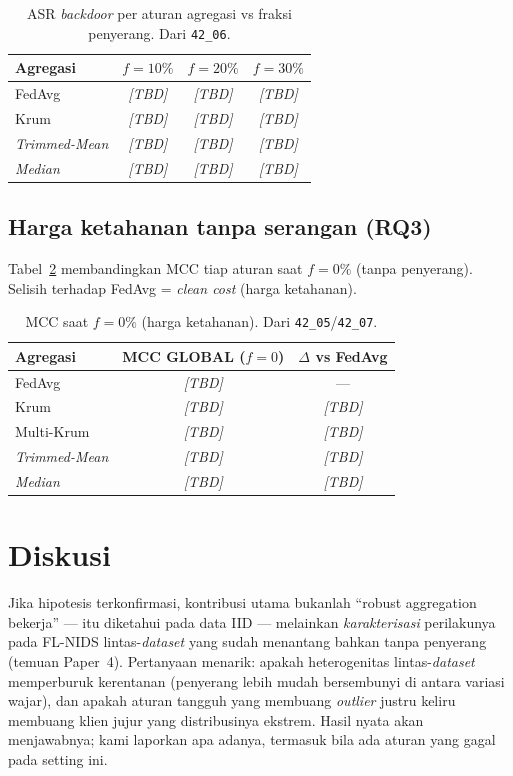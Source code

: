 \documentclass[11pt,a4paper]{article}
\newcommand{\TBD}{\textit{[TBD]}}
\begin{document}
\begin{table}[t]
\centering
\caption{ASR \emph{backdoor} per aturan agregasi vs fraksi penyerang. Dari \texttt{42\_06}.}
\label{tab:asr}
\begin{tabular}{lccc}
\toprule
Agregasi & $f{=}10\%$ & $f{=}20\%$ & $f{=}30\%$ \\
\midrule
FedAvg      & \TBD & \TBD & \TBD \\
Krum        & \TBD & \TBD & \TBD \\
\emph{Trimmed-Mean} & \TBD & \TBD & \TBD \\
\emph{Median} & \TBD & \TBD & \TBD \\
\bottomrule
\end{tabular}
\end{table}

\subsection{Harga ketahanan tanpa serangan (RQ3)}
Tabel~\ref{tab:clean} membandingkan MCC tiap aturan saat $f{=}0\%$ (tanpa penyerang).
Selisih terhadap FedAvg = \emph{clean cost} (harga ketahanan).

\begin{table}[t]
\centering
\caption{MCC saat $f{=}0\%$ (harga ketahanan). Dari \texttt{42\_05}/\texttt{42\_07}.}
\label{tab:clean}
\begin{tabular}{lcc}
\toprule
Agregasi & MCC GLOBAL ($f{=}0$) & $\Delta$ vs FedAvg \\
\midrule
FedAvg      & \TBD & --- \\
Krum        & \TBD & \TBD \\
Multi-Krum  & \TBD & \TBD \\
\emph{Trimmed-Mean} & \TBD & \TBD \\
\emph{Median} & \TBD & \TBD \\
\bottomrule
\end{tabular}
\end{table}

\FloatBarrier
\section{Diskusi}
\label{sec:discussion}

Jika hipotesis terkonfirmasi, kontribusi utama bukanlah ``robust aggregation
bekerja'' --- itu diketahui pada data IID --- melainkan \emph{karakterisasi}
perilakunya pada FL-NIDS lintas-\emph{dataset} yang sudah menantang bahkan tanpa
penyerang (temuan Paper~4). Pertanyaan menarik: apakah heterogenitas lintas-\emph{dataset}
memperburuk kerentanan (penyerang lebih mudah bersembunyi di antara variasi wajar),
dan apakah aturan tangguh yang membuang \emph{outlier} justru keliru membuang klien
jujur yang distribusinya ekstrem. Hasil nyata akan menjawabnya; kami laporkan apa
adanya, termasuk bila ada aturan yang gagal pada setting ini.
\end{document}
